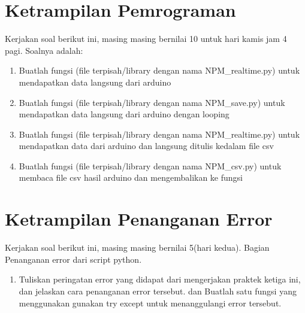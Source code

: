 \section{Ketrampilan Pemrograman}
Kerjakan soal berikut ini, masing masing bernilai 10 untuk hari kamis jam 4 pagi. Soalnya adalah:

\begin{enumerate}
\item
Buatlah fungsi (file terpisah/library dengan nama NPM\_realtime.py) untuk mendapatkan data langsung dari arduino
\item
Buatlah fungsi (file terpisah/library dengan nama NPM\_save.py) untuk mendapatkan data langsung dari arduino dengan looping
\item
Buatlah fungsi (file terpisah/library dengan nama NPM\_realtime.py) untuk mendapatkan data dari arduino dan langsung ditulis kedalam file csv
\item
Buatlah fungsi (file terpisah/library dengan nama NPM\_csv.py) untuk membaca file csv hasil arduino dan mengembalikan ke fungsi
\end{enumerate}




\section{Ketrampilan Penanganan Error}
Kerjakan soal berikut ini, masing masing bernilai 5(hari kedua). Bagian Penanganan error dari script python.
\begin{enumerate}
\item
Tuliskan peringatan error yang didapat dari mengerjakan praktek ketiga ini, dan jelaskan cara penanganan error tersebut.
dan Buatlah satu fungsi yang menggunakan gunakan try except untuk menanggulangi error tersebut.
\end{enumerate}



